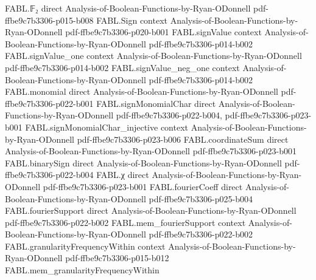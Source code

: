 \begin{theorem}
\label{FABL.expect_restrictionFourierCoeff}
\leanok
{}
\proofstep
  {FABL.𝔽₂}
  {direct}
  {Analysis-of-Boolean-Functions-by-Ryan-ODonnell}
  {pdf-ffbe9c7b3306-p015-b008}
\proofstep
  {FABL.Sign}
  {context}
  {Analysis-of-Boolean-Functions-by-Ryan-ODonnell}
  {pdf-ffbe9c7b3306-p020-b001}
\proofstep
  {FABL.signValue}
  {context}
  {Analysis-of-Boolean-Functions-by-Ryan-ODonnell}
  {pdf-ffbe9c7b3306-p014-b002}
\proofstep
  {FABL.signValue_one}
  {context}
  {Analysis-of-Boolean-Functions-by-Ryan-ODonnell}
  {pdf-ffbe9c7b3306-p014-b002}
\proofstep
  {FABL.signValue_neg_one}
  {context}
  {Analysis-of-Boolean-Functions-by-Ryan-ODonnell}
  {pdf-ffbe9c7b3306-p014-b002}
\proofstep
  {FABL.monomial}
  {direct}
  {Analysis-of-Boolean-Functions-by-Ryan-ODonnell}
  {pdf-ffbe9c7b3306-p022-b001}
\proofstep
  {FABL.signMonomialChar}
  {direct}
  {Analysis-of-Boolean-Functions-by-Ryan-ODonnell}
  {pdf-ffbe9c7b3306-p022-b004,
    pdf-ffbe9c7b3306-p023-b001}
\proofstep
  {FABL.signMonomialChar_injective}
  {context}
  {Analysis-of-Boolean-Functions-by-Ryan-ODonnell}
  {pdf-ffbe9c7b3306-p023-b006}
\proofstep
  {FABL.coordinateSum}
  {direct}
  {Analysis-of-Boolean-Functions-by-Ryan-ODonnell}
  {pdf-ffbe9c7b3306-p023-b001}
\proofstep
  {FABL.binarySign}
  {direct}
  {Analysis-of-Boolean-Functions-by-Ryan-ODonnell}
  {pdf-ffbe9c7b3306-p022-b004}
\proofstep
  {FABL.χ}
  {direct}
  {Analysis-of-Boolean-Functions-by-Ryan-ODonnell}
  {pdf-ffbe9c7b3306-p023-b001}
\proofstep
  {FABL.fourierCoeff}
  {direct}
  {Analysis-of-Boolean-Functions-by-Ryan-ODonnell}
  {pdf-ffbe9c7b3306-p025-b004}
\proofstep
  {FABL.fourierSupport}
  {direct}
  {Analysis-of-Boolean-Functions-by-Ryan-ODonnell}
  {pdf-ffbe9c7b3306-p022-b002}
\proofstep
  {FABL.mem_fourierSupport}
  {context}
  {Analysis-of-Boolean-Functions-by-Ryan-ODonnell}
  {pdf-ffbe9c7b3306-p022-b002}
\proofstep
  {FABL.granularityFrequencyWithin}
  {context}
  {Analysis-of-Boolean-Functions-by-Ryan-ODonnell}
  {pdf-ffbe9c7b3306-p015-b012}
\proofstep
  {FABL.mem_granularityFrequencyWithin}

\end{theorem}
